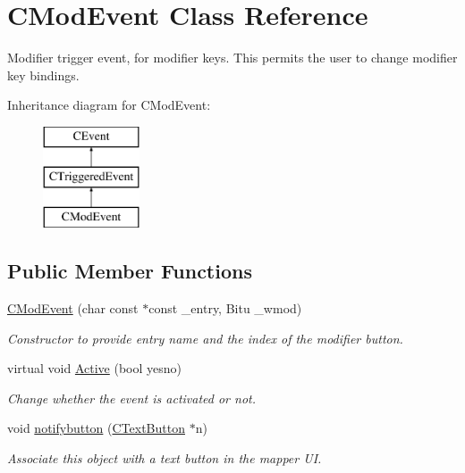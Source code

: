 \hypertarget{classCModEvent}{\section{C\-Mod\-Event Class Reference}
\label{classCModEvent}
}


Modifier trigger event, for modifier keys. This permits the user to change modifier key bindings.  


Inheritance diagram for C\-Mod\-Event\-:\begin{figure}[H]
\begin{center}
\leavevmode
\includegraphics[height=3.000000cm]{classCModEvent}
\end{center}
\end{figure}
\subsection*{Public Member Functions}
\begin{DoxyCompactItemize}
\item 
\hypertarget{classCModEvent_a1bf7b8ec974c1944dbfa3737cac5e426}{\hyperlink{classCModEvent_a1bf7b8ec974c1944dbfa3737cac5e426}{C\-Mod\-Event} (char const $\ast$const \-\_\-entry, Bitu \-\_\-wmod)}\label{classCModEvent_a1bf7b8ec974c1944dbfa3737cac5e426}

\begin{DoxyCompactList}\small\item\em Constructor to provide entry name and the index of the modifier button. \end{DoxyCompactList}\item 
\hypertarget{classCModEvent_a682d2590a915ef555a9f2c2d6aa927c8}{virtual void \hyperlink{classCModEvent_a682d2590a915ef555a9f2c2d6aa927c8}{Active} (bool yesno)}\label{classCModEvent_a682d2590a915ef555a9f2c2d6aa927c8}

\begin{DoxyCompactList}\small\item\em Change whether the event is activated or not. \end{DoxyCompactList}\item 
\hypertarget{classCModEvent_a20aea0373f707e3c8f047f6e52bf5f77}{void \hyperlink{classCModEvent_a20aea0373f707e3c8f047f6e52bf5f77}{notifybutton} (\hyperlink{classCTextButton}{C\-Text\-Button} $\ast$n)}\label{classCModEvent_a20aea0373f707e3c8f047f6e52bf5f77}

\begin{DoxyCompactList}\small\item\em Associate this object with a text button in the mapper U\-I. \end{DoxyCompactList}\end{DoxyCompactItemize}

